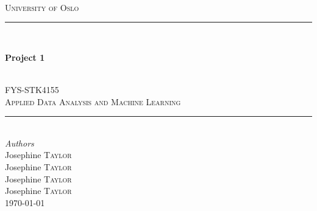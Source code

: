 \begin{titlepage}

\newcommand{\HRule}{\rule{\linewidth}{0.5mm}} %
\setlength{\topmargin}{0in}
\center %
 

\hspace{4cm}\\ 
\textsc{\LARGE University of Oslo}\\[2.5cm] %
\HRule \\[0.4cm]
{ \huge \bfseries  Project 1\par}\\[0.7cm]
\textsc{\Large FYS-STK4155}\\[0.2cm] %
\textsc{\large Applied Data Analysis and Machine Learning}\\[0.2cm] %
\vspace{0.4cm}
    \HRule \\[1.5cm]

  

\emph{Authors}\\ [0.2cm]
Josephine \textsc{Taylor} \\ %
Josephine \textsc{Taylor} \\
Josephine \textsc{Taylor} \\
Josephine \textsc{Taylor} \\[5cm]


{\large \today}\\[0.5cm] %


\vfill %

\end{titlepage}